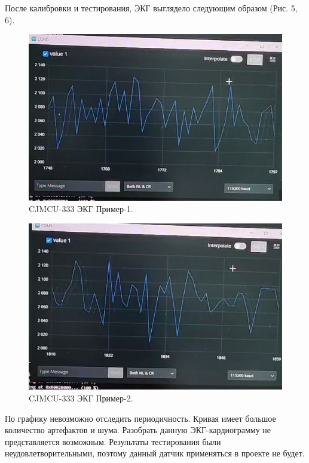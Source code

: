 \documentclass[12pt, russian]{extarticle}
\begin{document}
\begin{spacing}{1.5}
После калибровки и тестирования, ЭКГ выглядело следующим образом (Рис. 5, 6). \\

\begin{figure}[htbp]
\centering
\includegraphics[scale=0.6]{resources/cjmcu333/1.png}
\caption{CJMCU-333 ЭКГ Пример-1.}
\label{fig:my_label}
\end{figure}

\begin{figure}[htbp]
\centering
\includegraphics[scale=0.6]{resources/cjmcu333/2.png}
\caption{CJMCU-333 ЭКГ Пример-2.}
\label{fig:my_label}
\end{figure}

\newpage


По графику невозможно отследить периодичность. Кривая имеет большое количество артефактов и шума. Разобрать данную ЭКГ-кардиограмму не представляется возможным. Результаты тестирования были неудовлетворительными, поэтому данный датчик применяться в проекте не будет.


\end{spacing}
\end{document}
